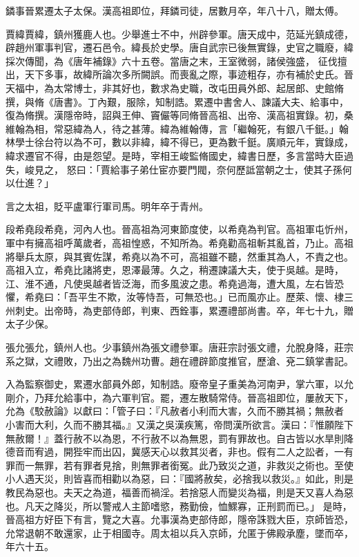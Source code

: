 \begin{pinyinscope}
 鏻事晉累遷太子太保。漢高祖即位，拜鏻司徒，居數月卒，年八十八，贈太傅。



 賈緯賈緯，鎮州獲鹿人也。少舉進士不中，州辟參軍。唐天成中，范延光鎮成德，辟趙州軍事判官，遷石邑令。緯長於史學。唐自武宗已後無實錄，史官之職廢，緯採次傳聞，為《唐年補錄》六十五卷。當唐之末，王室微弱，諸侯強盛，
 征伐擅出，天下多事，故緯所論次多所闕誤。而喪亂之際，事迹粗存，亦有補於史氏。晉天福中，為太常博士，非其好也，數求為史職，改屯田員外郎、起居郎、史館脩撰，與脩《唐書》。丁內艱，服除，知制誥。累遷中書舍人、諫議大夫、給事中，復為脩撰。漢隱帝時，詔與王伸、竇儼等同脩晉高祖、出帝、漢高祖實錄。初，桑維翰為相，常惡緯為人，待之甚薄。緯為維翰傳，言「繼翰死，有銀八千鋌。」翰林學士徐台符以為不可，數以非緯，緯不得已，更為數千鋌。廣順元年，實錄成，緯求遷官不得，由是怨望。是時，宰相王峻監脩國史，緯書日歷，多言當時大臣過失，峻見之，
 怒曰：「賈給事子弟仕宦亦要門閥，奈何歷詆當朝之士，使其子孫何以仕進？」



 言之太祖，貶平盧軍行軍司馬。明年卒于青州。



 段希堯段希堯，河內人也。晉高祖為河東節度使，以希堯為判官。高祖軍屯忻州，軍中有擁高祖呼萬歲者，高祖惶惑，不知所為。希堯勸高祖斬其亂首，乃止。高祖將舉兵太原，與其賓佐謀，希堯以為不可，高祖雖不聽，然重其為人，不責之也。高祖入立，希堯比諸將吏，恩澤最薄。久之，稍遷諫議大夫，使于吳越。是時，江、淮不通，凡使吳越者皆泛海，而多風波之患。希堯過海，遭大風，左右皆恐
 懼，希堯曰：「吾平生不欺，汝等恃吾，可無恐也。」已而風亦止。歷萊、懷、棣三州刺史。出帝時，為吏部侍郎，判東、西銓事，累遷禮部尚書。卒，年七十九，贈太子少保。



 張允張允，鎮州人也。少事鎮州為張文禮參軍。唐莊宗討張文禮，允脫身降，莊宗系之獄，文禮敗，乃出之為魏州功曹。趙在禮辟節度推官，歷滄、兗二鎮掌書記。



 入為監察御史，累遷水部員外郎，知制誥。廢帝皇子重美為河南尹，掌六軍，以允剛介，乃拜允給事中，為六軍判官。罷，遷左散騎常侍。晉高祖即位，屢赦天下，允為《駮赦論》以獻曰：「管子曰：『凡赦者小利而大害，久而不勝其禍；無赦者
 小害而大利，久而不勝其福。』又漢之吳漢疾篤，帝問漢所欲言。漢曰：『惟願陛下無赦爾！』蓋行赦不以為恩，不行赦不以為無恩，罰有罪故也。自古皆以水旱則降德音而宥過，開狴牢而出囚，冀感天心以救其災者，非也。假有二人之訟者，一有罪而一無罪，若有罪者見捨，則無罪者銜冤。此乃致災之道，非救災之術也。至使小人遇天災，則皆喜而相勸以為惡，曰：『國將赦矣，必捨我以救災。』如此，則是教民為惡也。夫天之為道，福善而禍淫。若捨惡人而變災為福，則是天又喜人為惡也。凡天之降災，所以警戒人主節嗜慾，務勤儉，恤鰥寡，正刑罰而已。」
 是時，晉高祖方好臣下有言，覽之大喜。允事漢為吏部侍郎，隱帝誅戮大臣，京師皆恐，允常退朝不敢還家，止于相國寺。周太祖以兵入京師，允匿于佛殿承塵，墜而卒，年六十五。




\end{pinyinscope}
